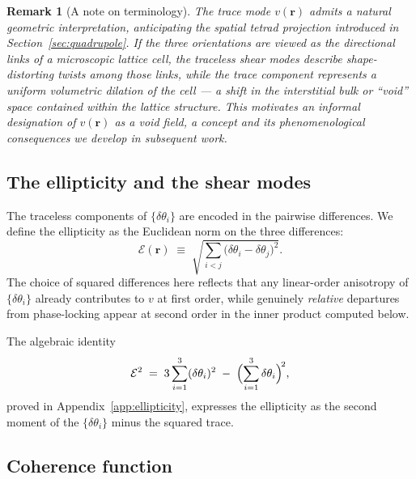 \documentclass[pdflatex,sn-mathphys-num]{sn-jnl}%
\theoremstyle{thmstyleone}%
\theoremstyle{thmstyletwo}%
\newtheorem{remark}{Remark}%
\theoremstyle{thmstylethree}%
\begin{document}
\begin{remark}[A note on terminology]
\label{rem:void_terminology}
The trace mode $v(\mathbf{r})$ admits a natural geometric
interpretation, anticipating the spatial tetrad projection
introduced in Section~\ref{sec:quadrupole}. If the three
orientations are viewed as the directional links of a
microscopic lattice cell, the traceless shear modes describe
shape-distorting twists among those links, while the trace
component represents a uniform volumetric dilation of the
cell — a shift in the interstitial bulk or ``void'' space
contained within the lattice structure. This motivates an
informal designation of $v(\mathbf{r})$ as a \emph{void
field}, a concept and its phenomenological consequences we
develop in subsequent work.
\end{remark}

\subsection{The ellipticity and the shear modes}

The traceless components of $\{\delta\theta_i\}$ are encoded
in the pairwise differences. We define the ellipticity as the
Euclidean norm on the three differences:
\begin{equation}
    \mathcal{E}(\mathbf{r})
    \;\equiv\;
    \sqrt{\sum_{i<j}\bigl(\delta\theta_i-\delta\theta_j\bigr)^2}.
    \label{eq:ellip_def}
\end{equation}
The choice of squared differences here reflects that any
linear-order anisotropy of $\{\delta\theta_i\}$ already
contributes to $v$ at first order, while genuinely
\emph{relative} departures from phase-locking appear at second
order in the inner product computed below.

The algebraic identity
\begin{equation}
    \mathcal{E}^2
    \;=\;
    3\sum_{i=1}^{3}(\delta\theta_i)^2
    \;-\;
    \Bigl(\sum_{i=1}^{3}\delta\theta_i\Bigr)^{\!2},
    \label{eq:ellip_identity}
\end{equation}
proved in Appendix~\ref{app:ellipticity}, expresses the
ellipticity as the second moment of the
$\{\delta\theta_i\}$ minus the squared trace.

\subsection{Coherence function}
\end{document}
